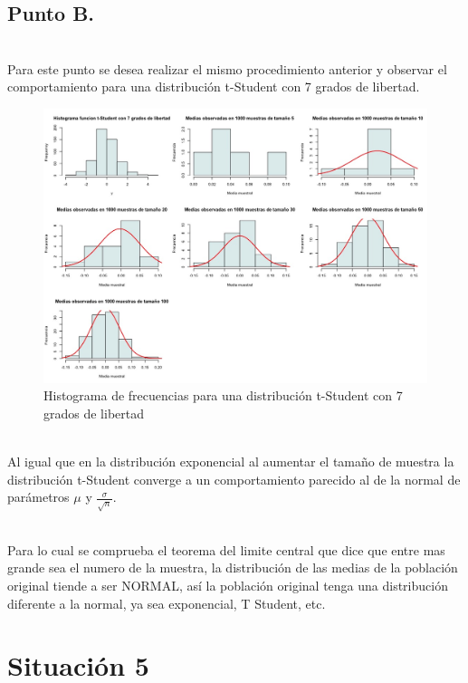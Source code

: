 \documentclass[letterpaper,12pt,onecolumn,titlepage]{article}
\begin{document}
\pagebreak\subsection{Punto B.}
~\\ Para este punto se desea realizar el mismo procedimiento anterior y observar el comportamiento para una distribuci\'{o}n t-Student con 7 grados de libertad.
\begin{figure}[!h]
    \begin{center}
        \includegraphics[width=15cm]{figuras/4b.jpeg}
        \caption{Histograma de frecuencias para una distribuci\'{o}n t-Student con 7 grados de libertad}
        \label{fig:Densidad}
    \end{center}
\end{figure}

~\\Al igual que en la distribuci\'{o}n exponencial al aumentar el tama\~{n}o de muestra la distribuci\'{o}n t-Student converge a un comportamiento parecido al de la normal de par\'{a}metros $\mu$ y $\frac{\sigma}{\sqrt{n}}$. 

~\\Para lo cual se comprueba el teorema del limite central que dice que entre mas grande sea el numero de la muestra, la distribuci\'{o}n de las medias de la poblaci\'{o}n original tiende a ser NORMAL, as\'{i} la poblaci\'{o}n original tenga una distribuci\'{o}n diferente a la normal, ya sea exponencial, T Student, etc.

\pagebreak\section{Situaci\'{o}n 5}
\end{document}
